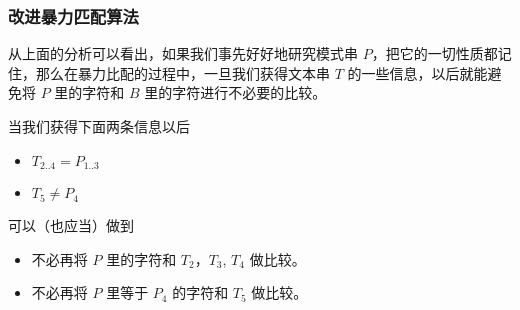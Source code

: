 \documentclass{ctexbeamer}
\begin{document}
\begin{frame}
  \frametitle{改进暴力匹配算法}
从上面的分析可以看出，如果我们{\kaishu 事先好好地研究模式串 $P$，把它的一切性质都记住}，那么在暴力比配的过程中，一旦我们获得文本串 $T$ 的一些信息，以后就能避免将 $P$ 里的字符和 $B$ 里的字符进行{\kaishu 不必要的比较}。 


当我们获得下面两条信息以后
  \begin{itemize}
    \item $T_{2..4} = P_{1..3}$
    \item $T_5 \ne P_4$
  \end{itemize}
可以（也应当）做到
\begin{itemize}
  \item 不必再将 $P$ 里的字符和 $T_{2}$，$T_{3}$, $T_{4}$ 做比较。
  \item 不必再将 $P$ 里等于 $P_4$ 的字符和 $T_5$ 做比较。
\end{itemize}
\end{frame}
\end{document}
